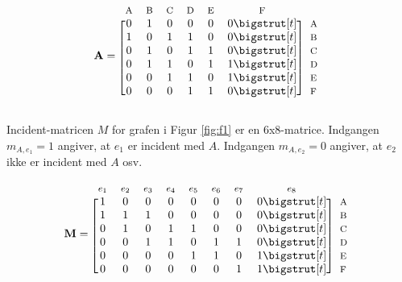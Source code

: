  \begin{equation*}
  \mathbf{A}=
  \begin{blockarray}{*{6}{c} l}
    \begin{block}{*{6}{>{$\footnotesize}c<{$}} l}
      A & B & C & D & E & F \\
    \end{block}
    \begin{block}{[*{6}{c}]>{$\footnotesize}l<{$}}
      0 & 1 & 0 & 0 & 0 & 0 \bigstrut[t]& A \\
      1 & 0 & 1 & 1 & 0 & 0 \bigstrut[t]&B \\
      0 & 1 & 0 & 1 & 1 & 0 \bigstrut[t]&C \\
      0 & 1 & 1 & 0 & 1 & 1 \bigstrut[t]& D \\
      0 & 0 & 1 & 1 & 0 & 1 \bigstrut[t]& E \\
      0 & 0 & 0 & 1 & 1 & 0 \bigstrut[t]& F \\
    \end{block}
  \end{blockarray}
\end{equation*} 

\noindent Incident-matricen $M$ for grafen i Figur \ref{fig:f1} er en $6$x$8$-matrice. Indgangen $m_{A,e_1}=1$ angiver, at $e_1$ er incident med $A$. Indgangen $m_{A,e_2}=0$ angiver, at $e_2$ ikke er incident med $A$ osv.

 \begin{equation*}
  \mathbf{M}=
  \begin{blockarray}{*{8}{c} l}
    \begin{block}{*{8}{>{$\footnotesize}c<{$}} l}
      $e_1$ & $e_2$ & $e_3$ & $e_4$ & $e_5$ & $e_6$ & $e_7$ & $e_8$ \\
    \end{block}
    \begin{block}{[*{8}{c}]>{$\footnotesize}l<{$}}
      1 & 0 & 0 & 0 & 0 & 0 & 0 & 0 \bigstrut[t]& A \\
      1 & 1 & 1 & 0 & 0 & 0 & 0 & 0 \bigstrut[t]&B \\
      0 & 1 & 0 & 1 & 1 & 0 & 0 & 0 \bigstrut[t]&C \\
     0 & 0 & 1 & 1 & 0 & 1 & 1 & 0 \bigstrut[t]& D \\
      0 & 0 & 0 & 0 & 1 & 1 & 0 & 1 \bigstrut[t]& E \\
     0 & 0 & 0 & 0 & 0 & 0 & 1 & 1 \bigstrut[t]& F \\
    \end{block}
  \end{blockarray}
\end{equation*}


